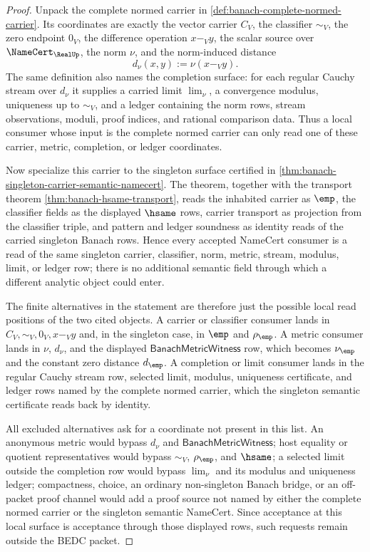 \begin{proof}
Unpack the complete normed carrier in
\autoref{def:banach-complete-normed-carrier}. Its coordinates are exactly the
vector carrier $C_V$, the classifier $\sim_V$, the zero endpoint $0_V$, the
difference operation $x-_V y$, the scalar source over $\NameCert_{\RealUp}$,
the norm $\nu$, and the norm-induced distance
$$
d_\nu(x,y):=\nu(x-_V y).
$$
The same definition also names the completion surface: for each regular Cauchy
stream over $d_\nu$ it supplies a carried limit $\lim_\nu$, a convergence
modulus, uniqueness up to $\sim_V$, and a ledger containing the norm rows,
stream observations, moduli, proof indices, and rational comparison data.
Thus a local consumer whose input is the complete normed carrier can only read
one of these carrier, metric, completion, or ledger coordinates.

Now specialize this carrier to the singleton surface certified in
\autoref{thm:banach-singleton-carrier-semantic-namecert}. The theorem,
together with the transport theorem \autoref{thm:banach-hsame-transport}, reads
the inhabited carrier as $\emp$, the classifier fields as the displayed
$\hsame$ rows, carrier transport as projection from the classifier triple, and
pattern and ledger soundness as identity reads of the carried singleton Banach
rows. Hence every accepted NameCert consumer is a read of the same singleton
carrier, classifier, norm, metric, stream, modulus, limit, or ledger row; there
is no additional semantic field through which a different analytic object could
enter.

The finite alternatives in the statement are therefore just the possible local
read positions of the two cited objects. A carrier or classifier consumer lands
in $C_V,\sim_V,0_V,x-_V y$ and, in the singleton case, in $\emp$ and
$\rho_{\emp}$. A metric consumer lands in $\nu$, $d_\nu$, and the displayed
$\mathsf{BanachMetricWitness}$ row, which becomes $\nu_{\emp}$ and the constant
zero distance $d_{\emp}$. A completion or limit consumer lands in the regular
Cauchy stream row, selected limit, modulus, uniqueness certificate, and ledger
rows named by the complete normed carrier, which the singleton semantic
certificate reads back by identity.

All excluded alternatives ask for a coordinate not present in this list. An
anonymous metric would bypass $d_\nu$ and
$\mathsf{BanachMetricWitness}$; host equality or quotient representatives would
bypass $\sim_V$, $\rho_{\emp}$, and $\hsame$; a selected limit outside the
completion row would bypass $\lim_\nu$ and its modulus and uniqueness ledger;
compactness, choice, an ordinary non-singleton Banach bridge, or an off-packet
proof channel would add a proof source not named by either the complete normed
carrier or the singleton semantic NameCert. Since acceptance at this local
surface is acceptance through those displayed rows, such requests remain
outside the BEDC packet.
\end{proof}

